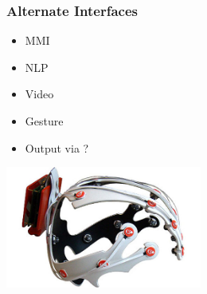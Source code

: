 \documentclass{beamer}
\begin{document}
           \begin{frame}
           	\frametitle{Alternate Interfaces}
           	
           	\begin{itemize}
           		\item  MMI
           		\item  NLP
           		\item  Video
           		\item  Gesture
           		\item Output via ?
           	\end{itemize}
           	
           	\includegraphics[height=4cm]{bci.jpg}
           	
           \end{frame}  
\end{document}
